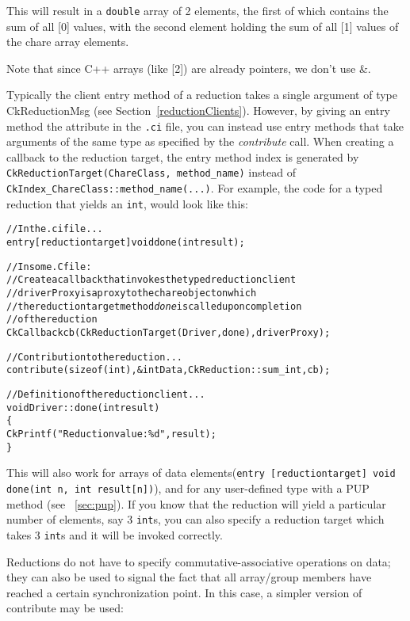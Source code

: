 This will result in a {\tt double} array of 2 elements, the first of which
contains the sum of all [0] values, with the second element 
holding the sum of all [1] values of the chare array elements.

Note that since C++ arrays (like [2]) are already pointers, we 
don't use \&.


Typically the client entry method of a reduction takes a single argument of
type CkReductionMsg (see Section~\ref{reductionClients}). However, by giving an entry method the
 attribute in the {\tt .ci} file, you can instead use entry methods that take
arguments of the same type as specified by the {\em contribute} call.  
When creating a callback to the
reduction target, the entry method index is generated by 
{\tt CkReductionTarget(ChareClass, method\_name)} 
instead of {\tt CkIndex\_ChareClass::method\_name(...)}.
For example,
the code for a typed reduction that yields an {\tt int}, would look like this:

\begin{alltt}
  // In the .ci file...
  entry [reductiontarget] void done(int result);

  // In some .C file: 
  // Create a callback that invokes the typed reduction client
  // driverProxy is a proxy to the chare object on which 
  // the reduction target method {\em done} is called upon completion 
  // of the reduction
  CkCallback cb(CkReductionTarget(Driver, done), driverProxy);

  // Contribution to the reduction...
  contribute(sizeof(int), &intData, CkReduction::sum_int, cb);

  // Definition of the reduction client...
  void Driver::done(int result) 
  \{
    CkPrintf("Reduction value: \%d", result);
  \}
\end{alltt}

This will also work for arrays of data 
elements({\tt entry [reductiontarget] void done(int n, int result[n])}), 
and for any user-defined type with a PUP method
(see ~\ref{sec:pup}). If you know that the reduction will yield a particular
number of elements, say 3 {\tt int}s, you can also specify a reduction target which
takes 3 {\tt int}s and it will be invoked correctly. 

Reductions do not have to specify commutative-associative operations on data;
they can also be used to signal the fact that all array/group members
have reached a certain synchronization point. In this case, a simpler version
of contribute may be used:

